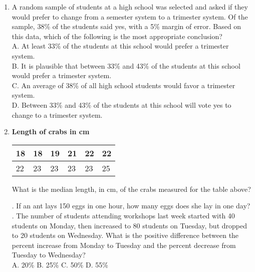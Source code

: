 \documentclass[../satmath.tex]{subfiles}
\begin{document}
\begin{enumerate}[label=\bfseries\arabic*.]
\item A random sample of students at a high school was selected and asked if they would prefer to change from a semester system to a trimester 
system. Of the sample, 38\% of the students said yes, with a 5\% margin of error. Based on this data, which of the following is the most appropriate conclusion?\\
A. At least 33\% of the students at this school would prefer a trimester system.\\
B. It is plausible that between 33\% and 43\% of the students at this school would prefer a trimester system.\\
C. An average of 38\% of all high school students would favor a trimester system.\\
D. Between 33\% and 43\% of the students at this school will vote yes to change to a trimester system.
 
\item 
\begin{center}
    \textbf{Length of crabs in cm}
\end{center}
\begin{table}[h]
    \centering
    \begin{tabular}{|l|l|l|l|l|l|}
    \hline
    18 & 18 & 19 & 21 & 22 & 22 \\ \hline
    22 & 23 & 23 & 23 & 23 & 25 \\ \hline
    \end{tabular}
\end{table}
What is the median length, in cm, of the crabs measured for the table above?

. If an ant lays 150 eggs in one hour, how many eggs does she lay in one day?
. The number of students attending workshops last week started with 40 students on Monday, then increased to 80 students on Tuesday, but dropped to 
20 students on Wednesday. What is the positive difference between the percent increase from Monday to Tuesday and the percent decrease from Tuesday to Wednesday?\\
A. 20\% \quad B. 25\% \quad C. 50\% \quad D. 55\%


\end{enumerate}
\end{document}
